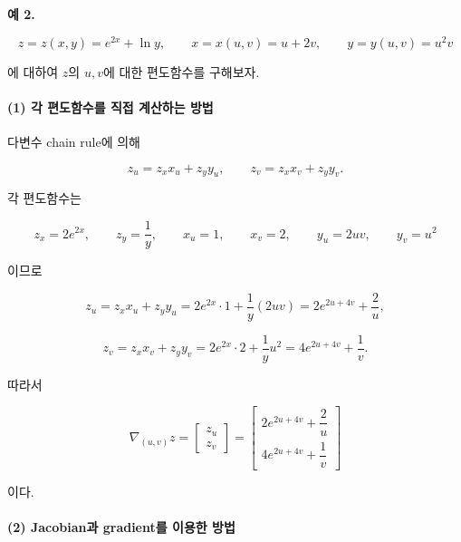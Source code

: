 \documentclass[11pt,a4paper]{article}
\begin{document}
\textbf{예 2.}

\[
z=z(x,y)=e^{2x}+\ln y,
\qquad
x=x(u,v)=u+2v,
\qquad
y=y(u,v)=u^2v
\]

에 대하여 $z$의 $u,v$에 대한 편도함수를 구해보자.

\begin{center}
\end{center}

\paragraph{(1) 각 편도함수를 직접 계산하는 방법}

다변수 chain rule에 의해

\[
z_u=z_xx_u+z_yy_u,
\qquad
z_v=z_xx_v+z_yy_v.
\]

각 편도함수는

\[
z_x=2e^{2x},
\qquad
z_y=\frac{1}{y},
\qquad
x_u=1,
\qquad
x_v=2,
\qquad
y_u=2uv,
\qquad
y_v=u^2
\]

이므로

\[
z_u
=
z_xx_u+z_yy_u
=
2e^{2x}\cdot 1
+
\frac{1}{y}(2uv)
=
2e^{2u+4v}
+
\frac{2}{u},
\]

\[
z_v
=
z_xx_v+z_yy_v
=
2e^{2x}\cdot 2
+
\frac{1}{y}u^2
=
4e^{2u+4v}
+
\frac{1}{v}.
\]

따라서

\[
\boxed{
\nabla_{(u,v)}z
=
\begin{bmatrix}
z_u\\
z_v
\end{bmatrix}
=
\begin{bmatrix}
2e^{2u+4v}+\dfrac{2}{u}\\[0.8em]
4e^{2u+4v}+\dfrac{1}{v}
\end{bmatrix}
}
\]

이다.

\paragraph{(2) Jacobian과 gradient를 이용한 방법}
\end{document}

